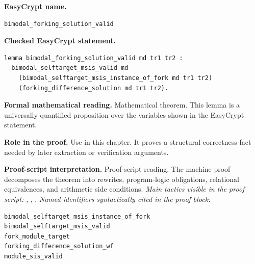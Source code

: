 \begin{formaltheorem}
\noindent\textbf{EasyCrypt name.}
\begin{lstlisting}[language=EasyCrypt,basicstyle=\ttfamily\scriptsize]
bimodal_forking_solution_valid
\end{lstlisting}
\noindent\textbf{Checked EasyCrypt statement.}
\begin{lstlisting}[language=EasyCrypt,basicstyle=\ttfamily\scriptsize]
lemma bimodal_forking_solution_valid md tr1 tr2 :
  bimodal_selftarget_msis_valid md
    (bimodal_selftarget_msis_instance_of_fork md tr1 tr2)
    (forking_difference_solution md tr1 tr2).
\end{lstlisting}
\noindent\textbf{Formal mathematical reading.}
Mathematical theorem. This lemma is a universally quantified proposition over the variables shown in the EasyCrypt statement.

\noindent\textbf{Role in the proof.}
Use in this chapter. It proves a structural correctness fact needed by later extraction or verification arguments.

\noindent\textbf{Proof-script interpretation.}
Proof-script reading. The machine proof decomposes the theorem into rewrites, program-logic obligations, relational equivalences, and arithmetic side conditions.
\emph{Main tactics visible in the proof script:} , , .
\emph{Named identifiers syntactically cited in the proof block:}
\begin{lstlisting}[language=EasyCrypt,basicstyle=\ttfamily\scriptsize]
bimodal_selftarget_msis_instance_of_fork
bimodal_selftarget_msis_valid
fork_module_target
forking_difference_solution_wf
module_sis_valid
\end{lstlisting}

\end{formaltheorem}

